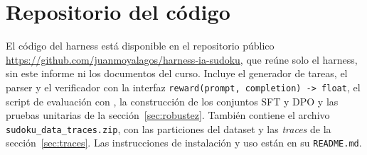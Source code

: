 \section{Repositorio del código}
\label{sec:repositorio}

El código del harness está disponible en el repositorio público
\url{https://github.com/juanmoyalagos/harness-ia-sudoku}, que reúne solo el
harness, sin este informe ni los documentos del curso. Incluye el generador de
tareas, el parser y el verificador con la interfaz
\texttt{reward(prompt, completion) -> float}, el script de evaluación con
\passk, la construcción de los conjuntos SFT y DPO y las pruebas unitarias de la
sección~\ref{sec:robustez}. También contiene el archivo
\texttt{sudoku\_data\_traces.zip}, con las particiones del dataset y las
\emph{traces} de la sección~\ref{sec:traces}. Las instrucciones de instalación y
uso están en su \texttt{README.md}.
